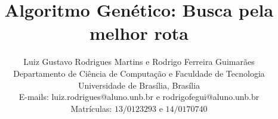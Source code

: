 \documentclass[conference]{IEEEtran}
\title{Algoritmo Genético: Busca pela melhor rota}
\author{Luiz Gustavo Rodrigues Martins e Rodrigo Ferreira Guimarães\\
Departamento de Ciência de Computação e Faculdade de Tecnologia\\
Universidade de Brasília, Brasília\\
E-mails: luiz.rodrigues@aluno.unb.br e rodrigofegui@aluno.unb.br\\
Matrículas: $13/0123293$ e $14/0170740$
}
\date{}
\begin{document}
\maketitle














\nocite{*}
\end{document}

